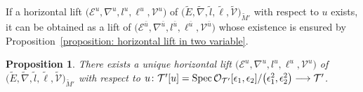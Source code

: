 \documentclass[pdftex]{sigma}
\numberwithin{equation}{section}
\newtheorem{Proposition}[Theorem]{Proposition}
\newcommand\Spec{\mathop{\rm Spec}\nolimits}
\begin{document}
If a horizontal lift
$\big({\mathcal E}^u,\nabla^u,l^u,\ell^u,{\mathcal V}^u\big)$
of
$\big(\tilde{E},\tilde{\nabla},\tilde{l},\tilde{\ell},\tilde{\mathcal V}\big)_{\tilde{M}'}$
with respect to $u$ exists,
it can be obtained as a lift of
$\big({\mathcal E}^{\bar{u}},\nabla^{\bar{u}},l^{\bar{u}},\ell^{\bar{u}},{\mathcal V}^{\bar{u}}\big)$
whose existence is ensured by Proposition~\ref{proposition: horizontal lift in two variable}.

\begin{Proposition} \label{proposition: horizontal lift in two variable of deep order}
There exists a unique horizontal lift
$\big({\mathcal E}^u,\nabla^u,l^u,\ell^u,{\mathcal V}^u\big)$
of
$\big(\tilde{E},\tilde{\nabla},\tilde{l},\tilde{\ell},\tilde{\mathcal V}\big)_{\tilde{M}'}$
with respect to
$u\colon {\mathcal T'}[u]=\Spec {\mathcal O}_{\mathcal T'}[\epsilon_1,\epsilon_2]
 /\big(\epsilon_1^2,\epsilon_2^2\big)
 \longrightarrow {\mathcal T'}$.
\end{Proposition}
\end{document}
